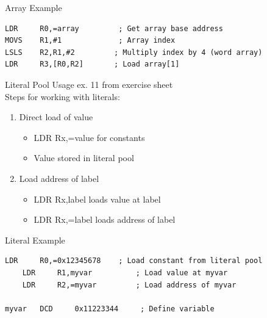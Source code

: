 \begin{example2}{Array Example}
\begin{lstlisting}[language=armasm, style=basesmol]
LDR     R0,=array         ; Get array base address
MOVS    R1,#1             ; Array index
LSLS    R2,R1,#2         ; Multiply index by 4 (word array)
LDR     R3,[R0,R2]       ; Load array[1]
\end{lstlisting}
\end{example2}



\begin{KR}{Literal Pool Usage} ex. 11 from exercise sheet\\
Steps for working with literals:
\begin{enumerate}
  \item Direct load of value
    \begin{itemize}
      \item LDR Rx,=value for constants
      \item Value stored in literal pool
    \end{itemize}
  \item Load address of label
    \begin{itemize}
      \item LDR Rx,label loads value at label
      \item LDR Rx,=label loads address of label
    \end{itemize}
\end{enumerate}
\end{KR}

\begin{example2}{Literal Example}
\begin{lstlisting}[language=armasm, style=basesmol]
    LDR     R0,=0x12345678    ; Load constant from literal pool
    LDR     R1,myvar          ; Load value at myvar
    LDR     R2,=myvar         ; Load address of myvar
    
myvar   DCD     0x11223344     ; Define variable
\end{lstlisting}
\end{example2}



